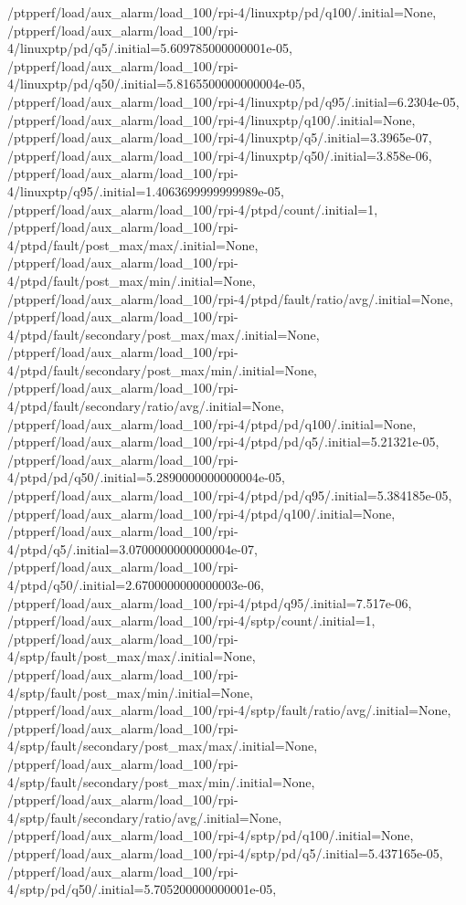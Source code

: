 {    /ptpperf/load/aux_alarm/load_100/rpi-4/linuxptp/pd/q100/.initial=None,
    /ptpperf/load/aux_alarm/load_100/rpi-4/linuxptp/pd/q5/.initial=5.609785000000001e-05,
    /ptpperf/load/aux_alarm/load_100/rpi-4/linuxptp/pd/q50/.initial=5.8165500000000004e-05,
    /ptpperf/load/aux_alarm/load_100/rpi-4/linuxptp/pd/q95/.initial=6.2304e-05,
    /ptpperf/load/aux_alarm/load_100/rpi-4/linuxptp/q100/.initial=None,
    /ptpperf/load/aux_alarm/load_100/rpi-4/linuxptp/q5/.initial=3.3965e-07,
    /ptpperf/load/aux_alarm/load_100/rpi-4/linuxptp/q50/.initial=3.858e-06,
    /ptpperf/load/aux_alarm/load_100/rpi-4/linuxptp/q95/.initial=1.4063699999999989e-05,
    /ptpperf/load/aux_alarm/load_100/rpi-4/ptpd/count/.initial=1,
    /ptpperf/load/aux_alarm/load_100/rpi-4/ptpd/fault/post_max/max/.initial=None,
    /ptpperf/load/aux_alarm/load_100/rpi-4/ptpd/fault/post_max/min/.initial=None,
    /ptpperf/load/aux_alarm/load_100/rpi-4/ptpd/fault/ratio/avg/.initial=None,
    /ptpperf/load/aux_alarm/load_100/rpi-4/ptpd/fault/secondary/post_max/max/.initial=None,
    /ptpperf/load/aux_alarm/load_100/rpi-4/ptpd/fault/secondary/post_max/min/.initial=None,
    /ptpperf/load/aux_alarm/load_100/rpi-4/ptpd/fault/secondary/ratio/avg/.initial=None,
    /ptpperf/load/aux_alarm/load_100/rpi-4/ptpd/pd/q100/.initial=None,
    /ptpperf/load/aux_alarm/load_100/rpi-4/ptpd/pd/q5/.initial=5.21321e-05,
    /ptpperf/load/aux_alarm/load_100/rpi-4/ptpd/pd/q50/.initial=5.2890000000000004e-05,
    /ptpperf/load/aux_alarm/load_100/rpi-4/ptpd/pd/q95/.initial=5.384185e-05,
    /ptpperf/load/aux_alarm/load_100/rpi-4/ptpd/q100/.initial=None,
    /ptpperf/load/aux_alarm/load_100/rpi-4/ptpd/q5/.initial=3.0700000000000004e-07,
    /ptpperf/load/aux_alarm/load_100/rpi-4/ptpd/q50/.initial=2.6700000000000003e-06,
    /ptpperf/load/aux_alarm/load_100/rpi-4/ptpd/q95/.initial=7.517e-06,
    /ptpperf/load/aux_alarm/load_100/rpi-4/sptp/count/.initial=1,
    /ptpperf/load/aux_alarm/load_100/rpi-4/sptp/fault/post_max/max/.initial=None,
    /ptpperf/load/aux_alarm/load_100/rpi-4/sptp/fault/post_max/min/.initial=None,
    /ptpperf/load/aux_alarm/load_100/rpi-4/sptp/fault/ratio/avg/.initial=None,
    /ptpperf/load/aux_alarm/load_100/rpi-4/sptp/fault/secondary/post_max/max/.initial=None,
    /ptpperf/load/aux_alarm/load_100/rpi-4/sptp/fault/secondary/post_max/min/.initial=None,
    /ptpperf/load/aux_alarm/load_100/rpi-4/sptp/fault/secondary/ratio/avg/.initial=None,
    /ptpperf/load/aux_alarm/load_100/rpi-4/sptp/pd/q100/.initial=None,
    /ptpperf/load/aux_alarm/load_100/rpi-4/sptp/pd/q5/.initial=5.437165e-05,
    /ptpperf/load/aux_alarm/load_100/rpi-4/sptp/pd/q50/.initial=5.705200000000001e-05,
}
